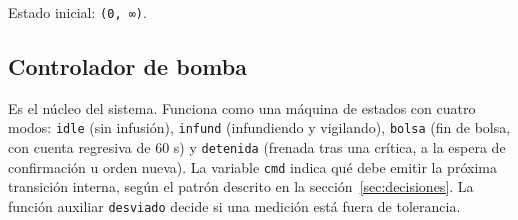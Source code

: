 \documentclass[11pt,a4paper]{article}
\begin{document}
\noindent Estado inicial: \texttt{(0, ∞)}.

\subsection{Controlador de bomba}

Es el núcleo del sistema. Funciona como una máquina de estados con cuatro modos: \texttt{idle} (sin infusión), \texttt{infund} (infundiendo y vigilando), \texttt{bolsa} (fin de bolsa, con cuenta regresiva de 60 s) y \texttt{detenida} (frenada tras una crítica, a la espera de confirmación u orden nueva). La variable \texttt{cmd} indica qué debe emitir la próxima transición interna, según el patrón descrito en la sección~\ref{sec:decisiones}. La función auxiliar \texttt{desviado} decide si una medición está fuera de tolerancia.
\end{document}
